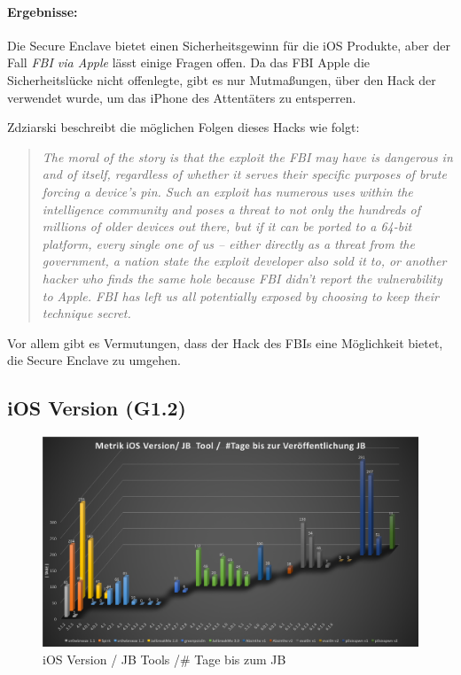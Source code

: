 \paragraph{Ergebnisse:} Die Secure Enclave bietet einen Sicherheitsgewinn für die iOS Produkte, aber der Fall \textit{\glqq FBI via Apple\grqq{}} lässt einige Fragen offen. Da das FBI Apple die Sicherheitslücke nicht offenlegte, gibt es nur Mutmaßungen, über den Hack der verwendet wurde, um das iPhone des Attentäters zu entsperren. \par 

Zdziarski beschreibt die möglichen Folgen dieses Hacks wie folgt: 
\begin{quote}
    \textit{\glqq The moral of the story is that the exploit the FBI may have is dangerous in and of itself, regardless of whether it serves their specific purposes of brute forcing a device’s pin. Such an exploit has numerous uses within the intelligence community and poses a threat to not only the hundreds of millions of older devices out there, but if it can be ported to a 64-bit platform, every single one of us – either directly as a threat from the government, a nation state the exploit developer also sold it to, or another hacker who finds the same hole because FBI didn’t report the vulnerability to Apple. FBI has left us all potentially exposed by choosing to keep their technique secret.\grqq{}} \cite{Hacking[4]} \par 
\end{quote}
Vor allem gibt es Vermutungen, dass der Hack des FBIs eine Möglichkeit bietet, die Secure Enclave zu umgehen.


\newpage
\subsection{iOS Version  (G1.2)}
\label{sec:Frage1iOSVersion} 

\begin{figure}[hp!]
        \centering
                \includegraphics[scale=0.38]{Bilder/Frage1_1.png}
        \caption{iOS Version / JB Tools /\# Tage bis zum JB \protect\footnotemark}
        \label{fig:AnalyseiOSJB1}        
\end{figure}

